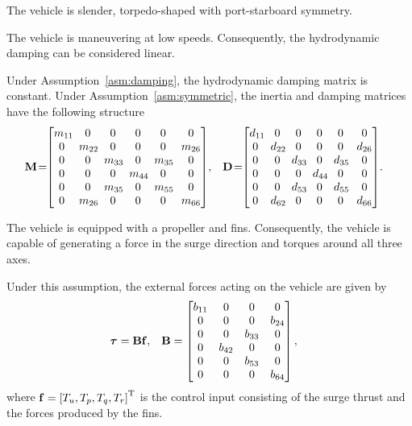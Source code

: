 \begin{asm}
    \label{asm:symmetric}
    The vehicle is slender, torpedo-shaped with port-starboard symmetry.
\end{asm}

\begin{asm}
    \label{asm:damping}
    The vehicle is maneuvering at low speeds.
    Consequently, the hydrodynamic damping can be considered linear.
\end{asm}

\noindent Under Assumption~\ref{asm:damping}, the hydrodynamic damping matrix is constant.
Under Assumption~\ref{asm:symmetric}, the inertia and damping matrices have the following structure
\begin{align}
    \mat{M}\! &= \!\!
    \begin{bmatrix}
        m_{11}\!\! & 0 & 0 & 0 & 0 & 0\\ 0 & \!m_{22}\!\! & 0 & 0 & 0 & m_{26}\\ 0 & 0 & \!m_{33}\!\! & 0 & \!m_{35}\!\! & 0\\ 0 & 0 & 0 & \!m_{44}\!\! & 0 & 0\\ 0 & 0 & \!m_{35}\!\! & 0 & \!m_{55}\!\! & 0\\ 0 & \!m_{26}\!\! & 0 & 0 & 0 & m_{66}
    \end{bmatrix}\!, &
    \mat{D}\! &= \!\!
    \begin{bmatrix}
        d_{11}\!\! & 0 & 0 & 0 & 0 & 0\\ 0 & \!d_{22}\!\! & 0 & 0 & 0 & d_{26}\\ 0 & 0 & \!d_{33}\!\! & 0 & \!d_{35}\!\! & 0\\ 0 & 0 & 0 & \!d_{44}\!\! & 0 & 0\\ 0 & 0 & \!d_{53}\!\! & 0 & \!d_{55}\!\! & 0\\ 0 & \!d_{62}\!\! & 0 & 0 & 0 & d_{66}
    \end{bmatrix}\!.
\end{align}

\begin{asm}
    \label{asm:actuators}
    The vehicle is equipped with a propeller and fins.
    Consequently, the vehicle is capable of generating a force in the surge direction and torques around all three axes.
\end{asm}
Under this assumption, the external forces acting on the vehicle are given by
\begin{align}
    \bm{\tau} &= \mathbf{B}\mathbf{f}, &
    \mathbf{B} &= 
    \begin{bmatrix}
        b_{11} & 0 & 0 & 0 \\ 0 & 0 & 0 & b_{24} \\ 0 & 0 & b_{33} & 0 \\ 0 & b_{42} & 0 & 0 \\ 0 & 0 & b_{53} & 0 \\ 0 & 0 & 0 & b_{64}
    \end{bmatrix},
\end{align}
where $\mathbf{f} = \left[T_u, T_p, T_q, T_r\right]^{\mathrm{T}}$ is the control input consisting of the surge thrust and the forces produced by the fins.

